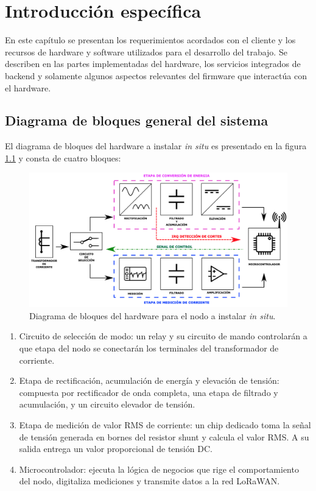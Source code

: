\chapter{Introducción específica} %
\label{Chapter2}
En este capítulo se presentan los requerimientos acordados con el cliente y los recursos de hardware y software utilizados para el desarrollo del trabajo. Se describen en las partes implementadas del hardware, los servicios integrados de backend y solamente algunos aspectos relevantes del firmware que interactúa con el hardware.\\
\section{Diagrama de bloques general del sistema}
El diagrama de bloques del hardware a instalar \textit{in situ} es presentado en la figura \ref{fig:diagramadebloquesdelhw} y consta de cuatro bloques:
\begin{figure}[h!]
	\centering
	\includegraphics[width=1.0\linewidth]{Figures/diagrama_de_bloques_del_HW}
	\caption{Diagrama de bloques del hardware para el nodo a instalar \textit{in situ}.}
	\label{fig:diagramadebloquesdelhw}
\end{figure}
\begin{enumerate}
	\item Circuito de selección de modo: un relay y su circuito de mando controlarán a que etapa del nodo se conectarán los terminales del transformador de corriente.
	\item Etapa de rectificación, acumulación de energía y elevación de tensión: compuesta por rectificador de onda completa, una etapa de filtrado y acumulación, y un circuito elevador de tensión.
	\item Etapa de medición de valor RMS de corriente: un chip dedicado toma la señal de tensión generada en bornes del resistor shunt y calcula el valor RMS. A su salida entrega un valor proporcional de tensión DC.
	\item Microcontrolador: ejecuta la lógica de negocios que rige el comportamiento del nodo, digitaliza mediciones y transmite datos a la red LoRaWAN.
\end{enumerate}
